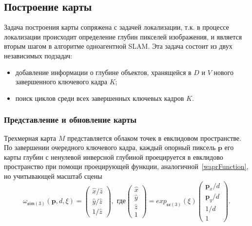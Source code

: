 \subsection{Построение карты}
Задача построения карты сопряжена с задачей локализации, т.к. в процессе локализации происходит определение глубин пикселей изображения, и является вторым шагом в алгоритме одноагентной SLAM. Эта задача состоит из двух независимых подзадач:
\begin{itemize}
    \item добавление информации о глубине объектов, хранящейся в $D$ и $V$ нового завершенного ключевого кадра $K$;
    \item поиск циклов среди всех завершенных ключевых кадров $K$.
\end{itemize}


\subsubsection{Представление и обновление карты}
Трехмерная карта $M$ представляется облаком точек в евклидовом пространстве. По завершении очередного ключевого кадра, каждый опорный пиксель $\mathbf{p}$ его карты глубин с ненулевой инверсной глубиной проецируется в евклидово пространство при помощи проецирующей функции, аналогичной~\ref{waprFunction}, но учитывающей масштаб сцены
\begin{equation}
    \label{warpFunction}
    \omega_{\mathfrak{sim}(3)}(\mathbf{p}, d, \xi) = \left(
                                \begin{array}{lll}
                                    \hat x / \hat z \\
                                    \hat y / \hat z \\
                                    1 / \hat z
                                \end{array}
                                \right),
    \text{~где}  \left(
                \begin{array}{llll}
                    \hat x \\
                    \hat y \\
                    \hat z \\
                    1
                \end{array}
                \right)
                =
                exp_{\mathfrak{se}(3)}(\xi)   \left(
                                            \begin{array}{llll}
                                                \mathbf{p}_x / d \\
                                                \mathbf{p}_y / d \\
                                                1 / d \\
                                                1
                                            \end{array}
                                            \right).
\end{equation}


